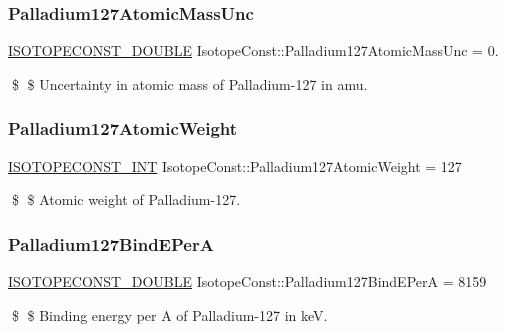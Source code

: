 \subsubsection{\texorpdfstring{Palladium127\+Atomic\+Mass\+Unc}{Palladium127AtomicMassUnc}}
{\footnotesize\ttfamily \mbox{\hyperlink{group___isotope_const-_macros_ga8f45a7272ce02c0b4c65c44636ed719a}{I\+S\+O\+T\+O\+P\+E\+C\+O\+N\+S\+T\+\_\+\+D\+O\+U\+B\+LE}} Isotope\+Const\+::\+Palladium127\+Atomic\+Mass\+Unc = 0.}

\$ \$ Uncertainty in atomic mass of Palladium-\/127 in amu. \mbox{\label{group___isotope_const-_palladium-_pd127_gaf13f7ba702d4bc3ca4c65cfe39effe57}} 
\subsubsection{\texorpdfstring{Palladium127\+Atomic\+Weight}{Palladium127AtomicWeight}}
{\footnotesize\ttfamily \mbox{\hyperlink{group___isotope_const-_macros_ga5f18360b3e99483a35c32d789e62621c}{I\+S\+O\+T\+O\+P\+E\+C\+O\+N\+S\+T\+\_\+\+I\+NT}} Isotope\+Const\+::\+Palladium127\+Atomic\+Weight = 127}

\$ \$ Atomic weight of Palladium-\/127. \mbox{\label{group___isotope_const-_palladium-_pd127_ga897bae2d5040664ab7eb88203c4aafee}} 
\subsubsection{\texorpdfstring{Palladium127\+Bind\+E\+PerA}{Palladium127BindEPerA}}
{\footnotesize\ttfamily \mbox{\hyperlink{group___isotope_const-_macros_ga8f45a7272ce02c0b4c65c44636ed719a}{I\+S\+O\+T\+O\+P\+E\+C\+O\+N\+S\+T\+\_\+\+D\+O\+U\+B\+LE}} Isotope\+Const\+::\+Palladium127\+Bind\+E\+PerA = 8159}

\$ \$ Binding energy per A of Palladium-\/127 in keV. \mbox{\label{group___isotope_const-_palladium-_pd127_ga7658a8337543bd946a610f29e26b1da3}} 
